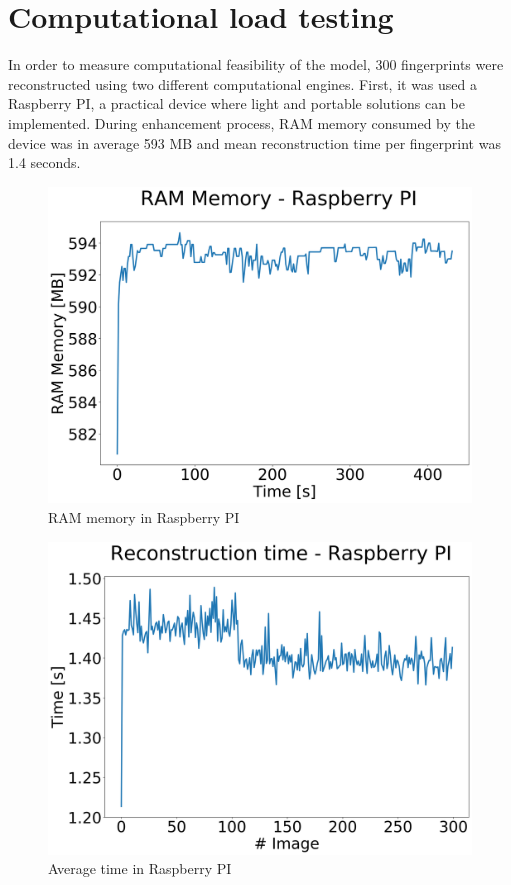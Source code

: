 \documentclass[a4paper,fleqn]{cas-dc}
\begin{document}
\section{Computational load testing}
\label{sec:COMLOAD}

In order to measure computational feasibility of the model, 300 fingerprints were reconstructed using two different computational engines. First, it was used a Raspberry PI, a practical device where light and portable solutions can be implemented. During enhancement process, RAM memory consumed by the device was in average 593 MB and mean reconstruction time per fingerprint was 1.4 seconds.

\begin{figure}[htbp]
\centerline{\includegraphics[scale=0.22]{figs/RAM RB.png}}
\caption{RAM memory in Raspberry PI}
\label{fig11}
\end{figure}

\begin{figure}[htbp]
\centerline{\includegraphics[scale=0.22]{figs/Time RB.png}}
\caption{Average time in Raspberry PI}
\label{fig11}
\end{figure}
\end{document}
